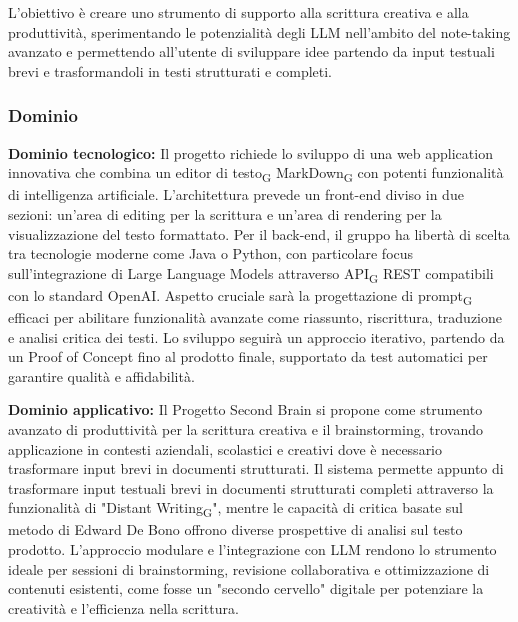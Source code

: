 \documentclass[11pt,a4paper]{article}
\newcommand{\gls}[1]{#1\textsubscript{G}}
\begin{document}
L'obiettivo è creare uno strumento di supporto alla scrittura creativa e alla produttività, sperimentando le potenzialità degli LLM nell'ambito del note-taking avanzato e permettendo all'utente di sviluppare idee partendo da input testuali brevi e trasformandoli in testi strutturati e completi.

\subsubsection{Dominio}
\textbf{Dominio tecnologico:} Il progetto richiede lo sviluppo di una web application innovativa che combina un \gls{editor di testo} \gls{MarkDown} con potenti funzionalità di intelligenza artificiale. L'architettura prevede un front-end diviso in due sezioni: un'area di editing per la scrittura e un'area di rendering per la visualizzazione del testo formattato. Per il back-end, il gruppo ha libertà di scelta tra tecnologie moderne come Java o Python, con particolare focus sull'integrazione di Large Language Models attraverso \gls{API} REST compatibili con lo standard OpenAI. Aspetto cruciale sarà la progettazione di \gls{prompt} efficaci per abilitare funzionalità avanzate come riassunto, riscrittura, traduzione e analisi critica dei testi. Lo sviluppo seguirà un approccio iterativo, partendo da un Proof of Concept fino al prodotto finale, supportato da test automatici per garantire qualità e affidabilità.

\vspace{0.5cm}

\noindent \textbf{Dominio applicativo:} Il Progetto Second Brain si propone come strumento avanzato di produttività per la scrittura creativa e il brainstorming,  trovando applicazione in contesti aziendali, scolastici e creativi dove è necessario trasformare input brevi in documenti strutturati.
Il sistema permette appunto di trasformare input testuali brevi in documenti strutturati completi attraverso la funzionalità di "\gls{Distant Writing}", mentre le capacità di critica basate sul metodo di Edward De Bono offrono diverse prospettive di analisi sul testo prodotto. L'approccio modulare e l'integrazione con LLM rendono lo strumento ideale per sessioni di brainstorming, revisione collaborativa e ottimizzazione di contenuti esistenti, come fosse un "secondo cervello" digitale per potenziare la creatività e l'efficienza nella scrittura.
\end{document}

